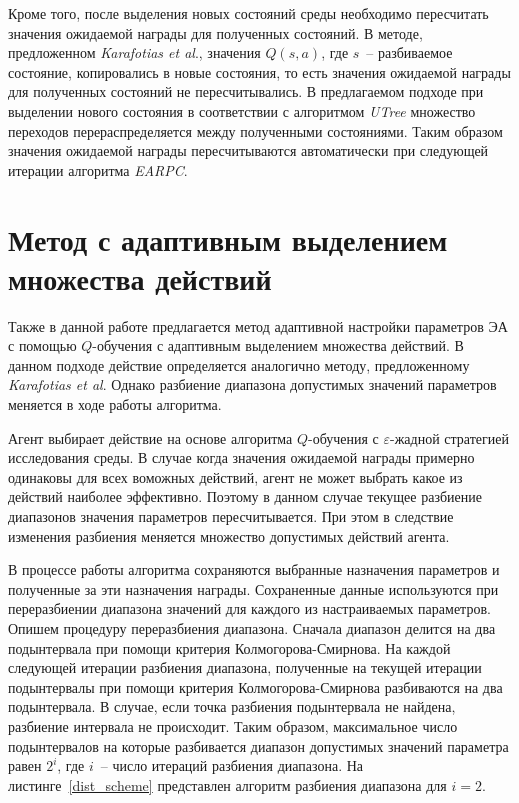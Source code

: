 Кроме того, после выделения новых состояний среды необходимо пересчитать значения ожидаемой награды для полученных состояний. В методе, предложенном \textit{Karafotias et al}., значения $Q(s, a)$, где $s$~-- разбиваемое состояние, копировались в новые состояния, то есть значения ожидаемой награды для полученных состояний не пересчитывались. В предлагаемом подходе при выделении нового состояния в соответствии с алгоритмом \textit{UTree} множество переходов перераспределяется между полученными состояниями. Таким образом значения ожидаемой награды пересчитываются автоматически при следующей итерации алгоритма \textit{EARPC}.

\section{Метод с адаптивным выделением множества действий}
\label{adaptive_method}

Также в данной работе предлагается метод адаптивной настройки параметров ЭА с помощью $Q$-обучения с адаптивным выделением множества действий. В данном подходе действие определяется аналогично методу, предложенному \textit{Karafotias et al}. Однако разбиение диапазона допустимых значений параметров меняется в ходе работы алгоритма.

Агент выбирает действие на основе алгоритма $Q$-обучения с $\varepsilon$-жадной стратегией исследования среды. В случае когда значения ожидаемой награды примерно одинаковы для всех воможных действий, агент не может выбрать какое из действий наиболее эффективно. Поэтому в данном случае текущее разбиение диапазонов значения параметров пересчитывается. При этом в следствие изменения разбиения меняется множество допустимых действий агента.

В процессе работы алгоритма сохраняются выбранные назначения параметров и полученные за эти назначения награды. Сохраненные данные используются при переразбиении диапазона значений для каждого из настраиваемых параметров. Опишем процедуру переразбиения диапазона. Сначала диапазон делится на два подынтервала при помощи критерия Колмогорова-Смирнова. На каждой следующей итерации разбиения диапазона, полученные на текущей итерации подынтервалы при помощи критерия Колмогорова-Смирнова разбиваются на два подынтервала. В случае, если точка разбиения подынтервала не найдена, разбиение интервала не происходит. Таким образом, максимальное число подынтервалов на которые разбивается диапазон допустимых значений параметра равен $2^i$, где $i$~-- число итераций разбиения диапазона. На листинге~\ref{dist_scheme} представлен алгоритм разбиения диапазона для $i = 2$.


